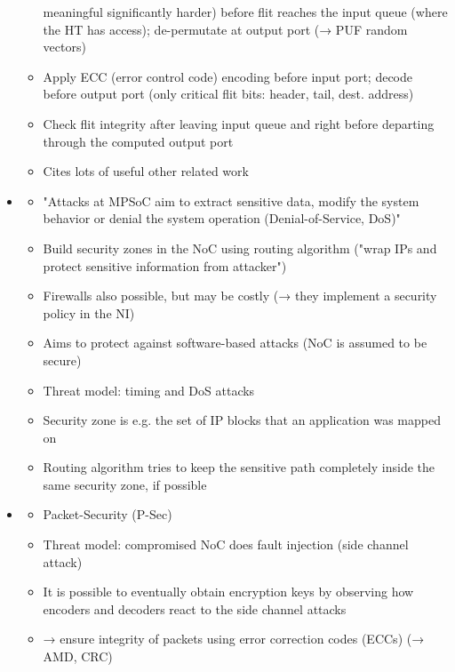 \begin{itemize}
\begin{itemize}
                meaningful significantly harder) before flit reaches the input queue (where the HT has access); de-permutate at output port (→
                PUF random vectors)
            \item Apply ECC (error control code) encoding before input port; decode before output port (only critical flit bits: header, tail,
                dest. address)
            \item Check flit integrity after leaving input queue and right before departing through the computed output port
            \item Cites lots of useful other related work
        \end{itemize}
    \item \textbf{} \checkmark
        \begin{itemize}
            \item "Attacks at MPSoC aim to extract sensitive data, modify the system behavior or denial the system operation (Denial-of-Service,
                DoS)"
            \item Build security zones in the NoC using routing algorithm ("wrap IPs and protect sensitive information from attacker")
            \item Firewalls also possible, but may be costly (→ they implement a security policy in the NI)
            \item Aims to protect against software-based attacks (NoC is assumed to be secure)
            \item Threat model: timing and DoS attacks
            \item Security zone is e.g. the set of IP blocks that an application was mapped on
            \item Routing algorithm tries to keep the sensitive path completely inside the same security zone, if possible
        \end{itemize}
    \item \textbf{} \checkmark
        \begin{itemize}
            \item Packet-Security (P-Sec)
            \item Threat model: compromised NoC does fault injection (side channel attack)
            \item It is possible to eventually obtain encryption keys by observing how encoders and decoders react to the side channel attacks
            \item → ensure integrity of packets using error correction codes (ECCs) (→ AMD, CRC)

\end{itemize}
\end{itemize}
